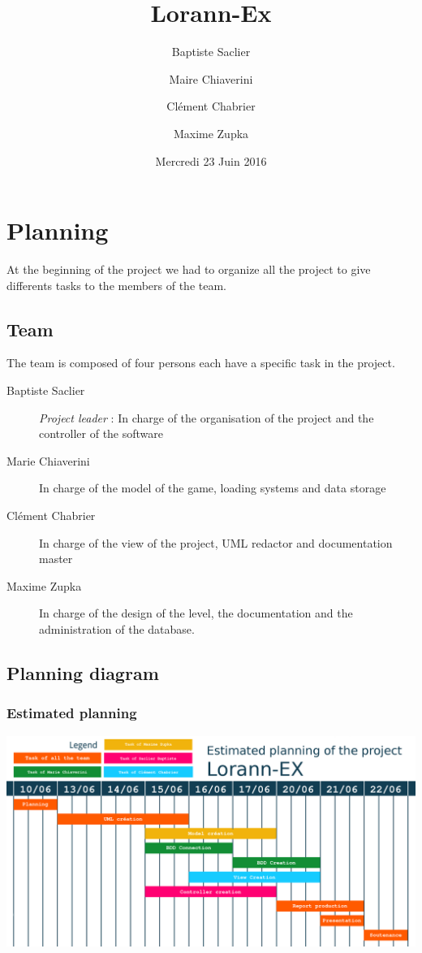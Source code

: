 \documentclass{report}
\title{Lorann-Ex}
\author{Baptiste Saclier\and Maire Chiaverini\and Clément Chabrier\and Maxime Zupka}
\date{Mercredi 23 Juin 2016}
\begin{document}
\maketitle

\tableofcontents
\clearpage

\chapter{Planning}

At the beginning of the project we had to organize all the project to give differents tasks to the members of the team.

\section{Team}

The team is composed of four persons each have a specific task in the project.

\begin{description}
\item[Baptiste Saclier] \emph{Project leader} : In charge of the organisation of the project and the controller of the software
\item[Marie Chiaverini] In charge of the model of the game, loading systems and data storage
\item[Clément Chabrier] In charge of the view of the project, UML redactor and documentation master
\item[Maxime Zupka] In charge of the design of the level, the documentation and the administration of the database.
\end{description}

\section{Planning diagram}

\subsection{Estimated planning}

\begin{center}
\includegraphics[scale=0.75]{resources/Planning-previsionnel.png}
\end{center}
\end{document}
